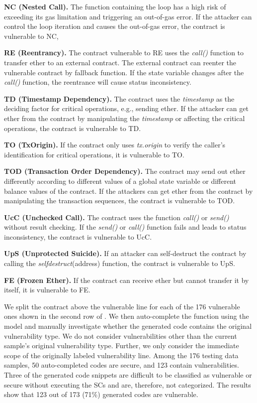 \documentclass[12pt]{book}
\begin{document}
\textbf{NC (Nested Call).}
The function containing the loop has a high risk of exceeding its gas limitation and triggering an out-of-gas error. If the attacker can control the loop iteration and causes the out-of-gas error, the contract is vulnerable to NC, 

\textbf{RE (Reentrancy).}
The contract vulnerable to RE uses the
\textit{call()} function to transfer ether to an external contract. The external contract can reenter the vulnerable contract by fallback function. If the state variable changes after the \textit{call()} function, the reentrance will cause status inconsistency. 

\textbf{TD (Timestamp Dependency).}
The contract uses the \textit{timestamp} as the deciding factor for critical operations, e.g., sending ether. If the attacker can get ether from the contract by manipulating the \textit{timestamp} or affecting the critical operations, the contract is vulnerable to TD.

\textbf{TO (TxOrigin).}
If the contract only uses \textit{tx.origin} to verify the caller's identification for critical operations, it is vulnerable to TO.

\textbf{TOD (Transaction Order Dependency).}
The contract may send out ether differently according to different values of a global state variable or different balance values of the contract. If the attackers can get ether from the contract by manipulating the transaction sequences, the contract is vulnerable to TOD.

\textbf{UcC (Unchecked Call).}
The contract uses the function \textit{call()} or \textit{send()} without result checking. If the \textit{send()} or \textit{call()}  function fails and leads to status inconsistency, the contract is vulnerable to UcC.

\textbf{UpS (Unprotected Suicide).}
If an attacker can self-destruct the contract by calling the \textit{selfdestruct}(address) function, the contract is vulnerable to UpS. 

\textbf{FE (Frozen Ether).}
If the contract can receive ether but cannot transfer it by itself, it is vulnerable to FE. 

We split the contract above the vulnerable line for each of the 176 vulnerable ones shown in the second row of . We then auto-complete the function using the model and manually investigate whether the generated code contains the original vulnerability type. We do not consider vulnerabilities other than the current sample's original vulnerability type. Further, we only consider the immediate scope of the originally labeled vulnerability line. Among the 176 testing data samples, 50 auto-completed codes are secure, and 123 contain vulnerabilities. Three of the generated code snippets are difficult to be classified as vulnerable or secure without executing the SCs and are, therefore, not categorized. The results show that 123 out of 173 (71\%) generated codes are vulnerable.
\end{document}
